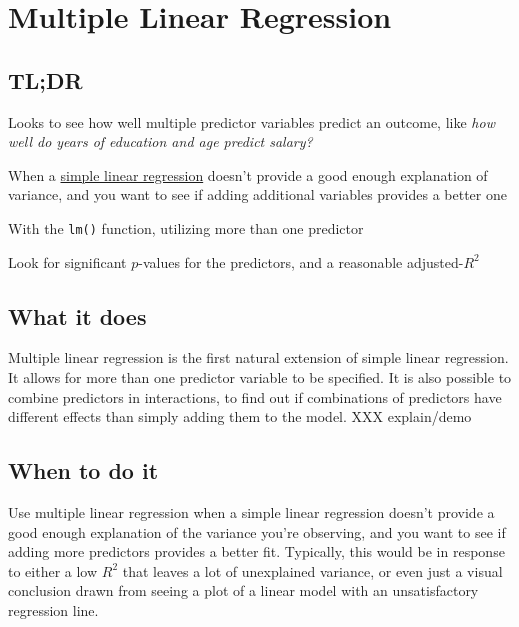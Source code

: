 \documentclass[
]{book}
\providecommand{\tightlist}{%
  \setlength{\itemsep}{0pt}\setlength{\parskip}{0pt}}
\begin{document}
\hypertarget{multiple-linear-regression}{%
\chapter{Multiple Linear Regression}\label{multiple-linear-regression}}

\hypertarget{tldr-1}{%
\section{TL;DR}\label{tldr-1}}

\begin{description}
\tightlist
\item[What it does]
Looks to see how well multiple predictor variables predict an outcome, like \emph{how well do years of education and age predict salary?}
\item[When to do it]
When a \protect\hyperlink{simple-linear-regression}{simple linear regression} doesn't provide a good enough explanation of variance, and you want to see if adding additional variables provides a better one
\item[How to do it]
With the \texttt{lm()} function, utilizing more than one predictor
\item[How to assess it]
Look for significant \(p\)-values for the predictors, and a reasonable adjusted-\(R^2\)
\end{description}

\hypertarget{what-it-does-1}{%
\section{What it does}\label{what-it-does-1}}

Multiple linear regression is the first natural extension of simple linear regression. It allows for more than one predictor variable to be specified. It is also possible to combine predictors in interactions, to find out if combinations of predictors have different effects than simply adding them to the model. XXX explain/demo

\hypertarget{when-to-do-it-1}{%
\section{When to do it}\label{when-to-do-it-1}}

Use multiple linear regression when a simple linear regression doesn't provide a good enough explanation of the variance you're observing, and you want to see if adding more predictors provides a better fit. Typically, this would be in response to either a low \(R^2\) that leaves a lot of unexplained variance, or even just a visual conclusion drawn from seeing a plot of a linear model with an unsatisfactory regression line.
\end{document}
